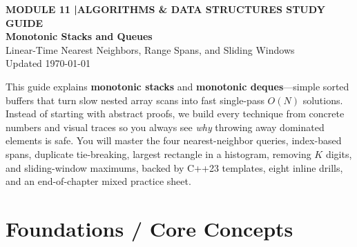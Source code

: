 \documentclass[11pt,a4paper]{article}
\newcommand{\sectionbreak}{}
\theoremstyle{definition}
\begin{document}
\thispagestyle{plain}
\begin{tcolorbox}[
    enhanced,
    colback=primaryblue!6, colframe=primaryblue!20,
    borderline west={5pt}{0pt}{primaryblue},
    arc=4pt, boxrule=0.6pt,
    left=14pt, right=14pt, top=7pt, bottom=7pt,
    before skip=0pt, after skip=5pt
]
    {\footnotesize\bfseries\color{accentteal}MODULE 11 \quad|\quad ALGORITHMS \& DATA STRUCTURES STUDY GUIDE}\\[3pt]
    {\Huge\bfseries\color{primaryblue}Monotonic Stacks and Queues}\\[3pt]
    {\large\color{codegray}Linear-Time Nearest Neighbors, Range Spans, and Sliding Windows}\\[4pt]
    {\footnotesize\color{codegray}Updated \today}
\end{tcolorbox}

\begin{overviewbox}
{\small This guide explains \textbf{monotonic stacks} and \textbf{monotonic deques}---simple sorted buffers that turn slow nested array scans into fast single-pass $O(N)$ solutions. Instead of starting with abstract proofs, we build every technique from concrete numbers and visual traces so you always see \emph{why} throwing away dominated elements is safe. You will master the four nearest-neighbor queries, index-based spans, duplicate tie-breaking, largest rectangle in a histogram, removing $K$ digits, and sliding-window maximums, backed by C++23 templates, eight inline drills, and an end-of-chapter mixed practice sheet.}
\end{overviewbox}

\vspace{-6pt}
{\setlength{\parskip}{0pt}\footnotesize
\titlespacing*{\section}{0pt}{2pt}{6pt}%
\makeatletter
\let\lm@orig@addvspace\addvspace
\renewcommand{\addvspace}[1]{\lm@orig@addvspace{0.10em plus 1pt}}
\makeatother
\tableofcontents}

\renewcommand{\sectionbreak}{\clearpage}

\section{Foundations / Core Concepts}
\end{document}
